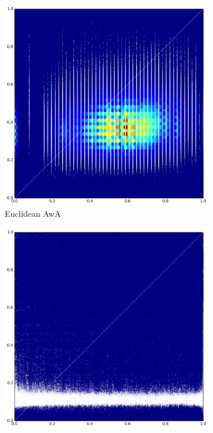 \begin{figure}[p]
\begin{subfigure}{.5\textwidth}
  \centering
  \includegraphics[width=\textwidth]{Figures/Euclidean_Metric_test_AwA}
  \caption{Euclidean AwA}
  \label{fig:sub1}
\end{subfigure}%
\begin{subfigure}{.5\textwidth}
  \centering
  \includegraphics[width=\textwidth]{Figures/Euclidean_Metric_test_MSRCv1}

\end{subfigure}
\end{figure}
